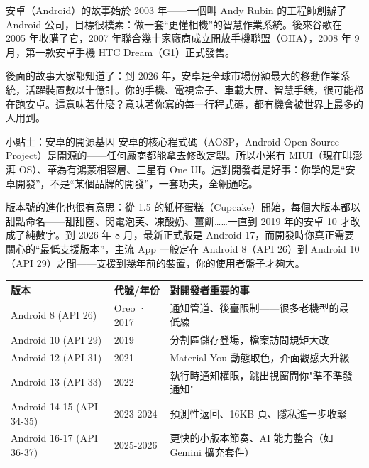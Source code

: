 


安卓（Android）的故事始於 2003 年——一個叫 Andy Rubin 的工程師創辦了 Android 公司，目標很樸素：做一套“更懂相機”的智慧作業系統。後來谷歌在 2005 年收購了它，2007 年聯合幾十家廠商成立開放手機聯盟（OHA），2008 年 9 月，第一款安卓手機 HTC Dream（G1）正式發售。

後面的故事大家都知道了：到 2026 年，安卓是全球市場份額最大的移動作業系統，活躍裝置數以十億計。你的手機、電視盒子、車載大屏、智慧手錶，很可能都在跑安卓。這意味著什麼？意味著你寫的每一行程式碼，都有機會被世界上最多的人用到。

\begin{tcbinfo}{小貼士：安卓的開源基因}
安卓的核心程式碼（AOSP，Android Open Source Project）是開源的——任何廠商都能拿去修改定製。所以小米有 MIUI（現在叫澎湃 OS）、華為有鴻蒙相容層、三星有 One UI。這對開發者是好事：你學的是“安卓開發”，不是“某個品牌的開發”，一套功夫，全網通吃。

\end{tcbinfo}

版本號的進化也很有意思：從 1.5 的紙杯蛋糕（Cupcake）開始，每個大版本都以甜點命名——甜甜圈、閃電泡芙、凍酸奶、薑餅……一直到 2019 年的安卓 10 才改成了純數字。到 2026 年 8 月，最新正式版是 Android 17，而開發時你真正需要關心的“最低支援版本”，主流 App 一般定在 Android 8（API 26）到 Android 10（API 29）之間——支援到幾年前的裝置，你的使用者盤子才夠大。

\begin{center}
\begin{tabularx}{\linewidth}{|X|X|X|}
\hline
\textbf{版本} & \textbf{代號/年份} & \textbf{對開發者重要的事} \tabularnewline
\hline
Android 8 (API 26) & Oreo · 2017 & 通知管道、後臺限制——很多老機型的最低線 \tabularnewline
Android 10 (API 29) & 2019 & 分割區儲存登場，檔案訪問規矩大改 \tabularnewline
Android 12 (API 31) & 2021 & Material You 動態取色，介面觀感大升級 \tabularnewline
Android 13 (API 33) & 2022 & 執行時通知權限，跳出視窗問你"準不準發通知" \tabularnewline
Android 14-15 (API 34-35) & 2023-2024 & 預測性返回、16KB 頁、隱私進一步收緊 \tabularnewline
Android 16-17 (API 36-37) & 2025-2026 & 更快的小版本節奏、AI 能力整合（如 Gemini 擴充套件） \tabularnewline
\hline
\end{tabularx}
\end{center}

